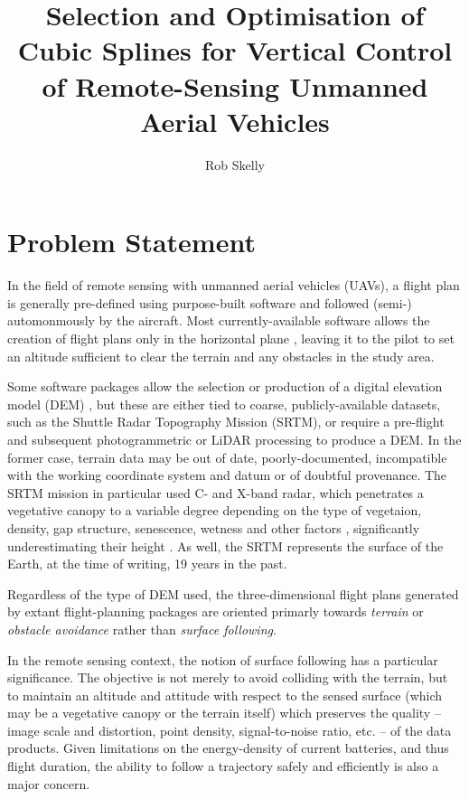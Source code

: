 \documentclass[doc]{apa6}
\title{Selection and Optimisation of Cubic Splines for Vertical Control of Remote-Sensing Unmanned Aerial Vehicles}
\author{Rob Skelly}
\affiliation{University of Victoria}
\begin{document}
\maketitle

\section{Problem Statement}

In the field of remote sensing with unmanned aerial vehicles (UAVs), a flight plan is generally pre-defined using purpose-built software and followed (semi-) automonmously by the aircraft. Most currently-available software allows the creation of flight plans only in the horizontal plane \parencite[e.g.,][]{ArduPilot2018,DJI2018a,Microdrones2018,Group2018,UAVToolbox2018}, leaving it to the pilot to set an altitude sufficient to clear the terrain and any obstacles in the study area. 

Some software packages allow the selection or production of a digital elevation model (DEM) \parencite[e.g.,][]{PrecisionHawk2018,UgCS2018,MapsMadeEasy2018}, but these are either tied to coarse, publicly-available datasets, such as the Shuttle Radar Topography Mission (SRTM), or require a pre-flight and subsequent photogrammetric or LiDAR processing to produce a DEM. In the former case, terrain data may be out of date, poorly-documented, incompatible with the working coordinate system and datum or of doubtful provenance. The SRTM mission in particular used C- and X-band radar, which penetrates a vegetative canopy to a variable degree depending on the type of vegetaion, density, gap structure, senescence, wetness and other factors \parencite{Miliaresis2009}, significantly underestimating their height \parencite{Sexton2009}. As well, the SRTM represents the surface of the Earth, at the time of writing, 19 years in the past. 

Regardless of the type of DEM used, the three-dimensional flight plans generated by extant flight-planning packages are oriented primarly towards \emph{terrain} or \emph{obstacle avoidance} rather than \emph{surface following}. 

In the remote sensing context, the notion of surface following has a particular significance. The objective is not merely to avoid colliding with the terrain, but to maintain an altitude and attitude with respect to the sensed surface (which may be a vegetative canopy or the terrain itself) which preserves the quality -- image scale and distortion, point density, signal-to-noise ratio, etc. -- of the data products. Given limitations on the energy-density of current batteries, and thus flight duration, the ability to follow a trajectory safely and efficiently is also a major concern.
\end{document}
